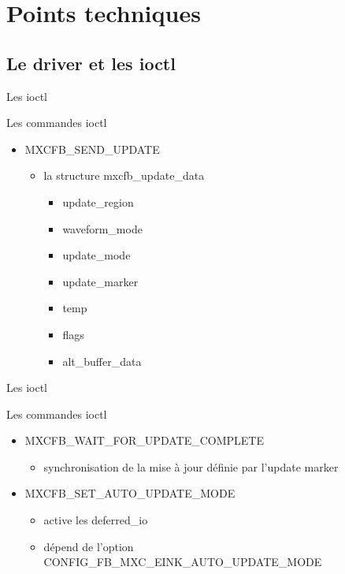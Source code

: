 \section{Points techniques}


\subsection{Le driver et les ioctl}
\begin{frame}[fragile]{Les ioctl}
	\begin{block}{Les commandes ioctl}
		\begin{itemize}
			\item MXCFB\_SEND\_UPDATE 
				\begin{itemize}
					\item la structure mxcfb\_update\_data 
							\begin{itemize}
								\item update\_region
								\item waveform\_mode
								\item update\_mode
								\item update\_marker
								\item temp
								\item flags
								\item alt\_buffer\_data
							\end{itemize}
				\end{itemize}
		\end{itemize}
	\end{block}
\end{frame}

\begin{frame}{Les ioctl}
	\begin{block} {Les commandes ioctl}
		\begin{itemize}
				\item MXCFB\_WAIT\_FOR\_UPDATE\_COMPLETE
			\begin{itemize}
				\item synchronisation de la mise à jour définie par l'update marker
			\end{itemize}
			\item MXCFB\_SET\_AUTO\_UPDATE\_MODE
			\begin{itemize}
				\item active les deferred\_io
				\item dépend de l'option CONFIG\_FB\_MXC\_EINK\_AUTO\_UPDATE\_MODE
			\end{itemize}
		\end{itemize}
	\end{block}
\end{frame}

